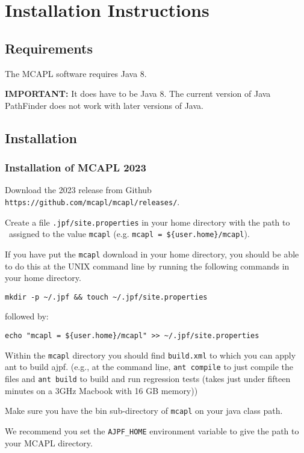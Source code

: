 \chapter{Installation Instructions}
\label{chap:installation}
\section{Requirements}

The MCAPL software requires Java 8.   

{\bf IMPORTANT:} It does have to be Java 8.  The current version of Java PathFinder does not work with later versions of Java.

\section{Installation}

\subsection{Installation of MCAPL 2023}

\begin{itemize}
\begin{sloppypar}
\item Download the 2023 release from Github \texttt{https://github.com/mcapl/mcapl/releases/}.
\end{sloppypar}
\item Create a file \texttt{.jpf/site.properties} in your home directory with the path to \ajpfversion\ assigned to the value \texttt{mcapl}
  (e.g. \texttt{mcapl = \$\{user.home\}/mcapl}).
  
If you have put the \texttt{mcapl} download in your home directory,  you should be able to do this at the UNIX command line by running the following commands in your home directory.
\begin{verbatim}
mkdir -p ~/.jpf && touch ~/.jpf/site.properties
\end{verbatim}
followed by:
\begin{verbatim}
echo "mcapl = ${user.home}/mcapl" >> ~/.jpf/site.properties
\end{verbatim}

\item Within the \texttt{mcapl} directory you should find \texttt{build.xml} to which you can apply ant to build ajpf. (e.g., at the command line, \lstinline{ant compile} to just compile the files and \lstinline{ant build} to build and run regression tests (takes just under fifteen minutes on a 3GHz Macbook with 16 GB memory))
\item Make sure you have the bin sub-directory of \texttt{mcapl} on your java class path.
\item We recommend you set the \texttt{AJPF\_HOME} environment variable to give the path to your MCAPL directory.
\end{itemize}

